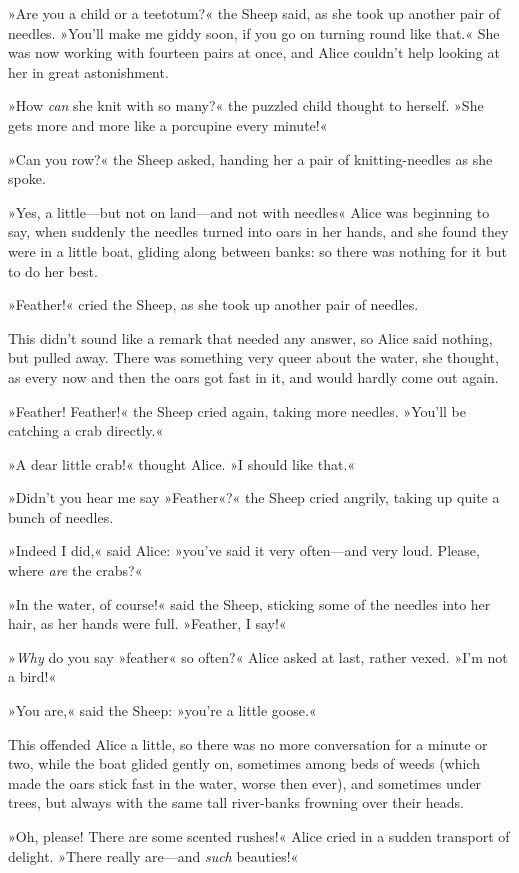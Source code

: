 »Are you a child or a teetotum?« the Sheep said, as she took up another pair of needles. »You'll make me giddy soon, if you go on turning round like that.« She was now working with fourteen pairs at once, and Alice couldn't help looking at her in great astonishment.

»How \textit{can} she knit with so many?« the puzzled child thought to herself. »She gets more and more like a porcupine every minute!«

»Can you row?« the Sheep asked, handing her a pair of knitting-needles as she spoke.

»Yes, a little—but not on land—and not with needles\longdash« Alice was beginning to say, when suddenly the needles turned into oars in her hands, and she found they were in a little boat, gliding along between banks: so there was nothing for it but to do her best.

»Feather!« cried the Sheep, as she took up another pair of needles.

This didn't sound like a remark that needed any answer, so Alice said nothing, but pulled away. There was something very queer about the water, she thought, as every now and then the oars got fast in it, and would hardly come out again.

»Feather! Feather!« the Sheep cried again, taking more needles. »You'll be catching a crab directly.«

»A dear little crab!« thought Alice. »I should like that.«

»Didn't you hear me say »Feather«?« the Sheep cried angrily, taking up quite a bunch of needles.

»Indeed I did,« said Alice: »you've said it very often—and very loud. Please, where \textit{are} the crabs?«

»In the water, of course!« said the Sheep, sticking some of the needles into her hair, as her hands were full. »Feather, I say!«

»\textit{Why} do you say »feather« so often?« Alice asked at last, rather vexed. »I'm not a bird!«

»You are,« said the Sheep: »you're a little goose.«

This offended Alice a little, so there was no more conversation for a minute or two, while the boat glided gently on, sometimes among beds of weeds (which made the oars stick fast in the water, worse then ever), and sometimes under trees, but always with the same tall river-banks frowning over their heads.

»Oh, please! There are some scented rushes!« Alice cried in a sudden transport of delight. »There really are—and \textit{such} beauties!«

